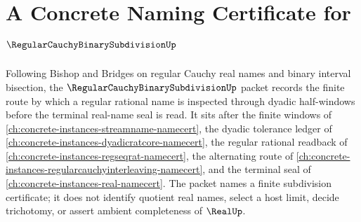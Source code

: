 \chapter{A Concrete Naming Certificate for $\RegularCauchyBinarySubdivisionUp$}
\label{ch:concrete-instances-regular-cauchy-binary-subdivision-namecert}

Following Bishop and Bridges on regular Cauchy real names and binary interval bisection, the $\RegularCauchyBinarySubdivisionUp$ packet records the finite route by which a regular rational name is inspected through dyadic half-windows before the terminal real-name seal is read. It sits after the finite windows of \autoref{ch:concrete-instances-streamname-namecert}, the dyadic tolerance ledger of \autoref{ch:concrete-instances-dyadicratcore-namecert}, the regular rational readback of \autoref{ch:concrete-instances-regseqrat-namecert}, the alternating route of \autoref{ch:concrete-instances-regularcauchyinterleaving-namecert}, and the terminal seal of \autoref{ch:concrete-instances-real-namecert}. The packet names a finite subdivision certificate; it does not identify quotient real names, select a host limit, decide trichotomy, or assert ambient completeness of $\RealUp$.

